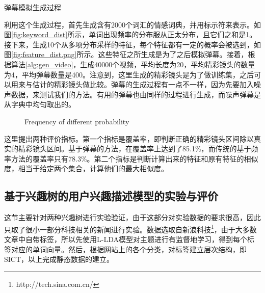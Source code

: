 \begin{algorithm}[!bht]
\caption{弹幕模拟生成过程}
\label{alg:gen_video}
\end{algorithm}

利用这个生成过程，首先生成含有2000个词汇的情感词典，并用标示符来表示。如图\ref{fig:keyword_dist}所示，单词出现频率的分布服从正太分布，且它们之和是1。接下来，生成10个从多项分布采样的特征，每个特征都有一定的概率会被选到，如图\ref{fig:feature_dist.png}所示。这些特征之所生成是为了之后模拟弹幕。接着，根据算法\ref{alg:gen_video}，生成40000个视频，平均长度为20，平均精彩镜头的数量为4，平均弹幕数量是400。注意到，这里生成的精彩镜头是为了做训练集，之后可以用来与估计的精彩镜头做比较。弹幕的生成过程有一点不一样，因为先要加入噪声数据，来测试我们的方法。有用的弹幕也由同样的过程进行生成，而噪声弹幕是从字典中均匀取出的。

\begin{figure}[!hbt]
  \hfill
  \hfill
\caption{Frequency of different probability}
\end{figure}

这里提出两种评价指标。第一个指标是覆盖率，即判断正确的精彩镜头区间除以真实的精彩镜头区间。基于弹幕的方法，在覆盖率上达到了85.1\%，而传统的基于频率方法的覆盖率只有78.3\%。第二个指标是判断计算出来的特征和原有特征的相似度，相当于给定两个集合，计算他们的最大相似度。

\subsection{基于兴趣树的用户兴趣描述模型的实验与评价}
这节主要针对两种兴趣树进行实验验证，由于这部分对实验数据的要求很高，因此只取了很小一部分科技相关的新闻进行实验。数据选取自新浪科技\footnote{http://tech.sina.com.cn/}，由于大多数文章中自带标签，所以先使用L-LDA模型对主题进行有监督地学习，得到每个标签对应的单词向量。然后，根据网站上的各个分类，对标签建立层次结构，即SICT，以上完成静态数据的建立。

